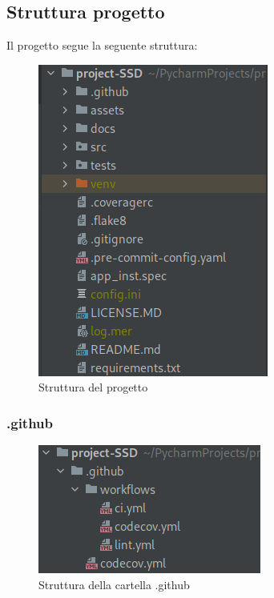 \subsection{Struttura progetto}
Il progetto segue la seguente struttura:
\begin{figure}[H]
    \centering
    \includegraphics[scale = 0.5]{components/img/struttura-cartella-ssd.png}
    \caption{Struttura del progetto}
    \label{fig:Struttura del progetto}
\end{figure}  
\subsubsection{.github}    
\begin{figure}[H]
    \centering
    \includegraphics[scale = 0.5]{components/img/struttura-cartella-dotgithub.png}
    \caption{Struttura della cartella .github}
    \label{fig:Struttura della cartella .github}
\end{figure}    
